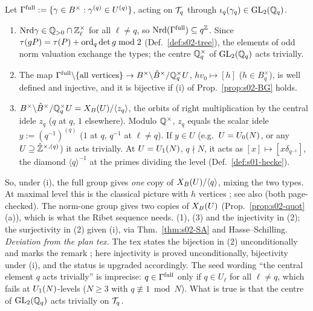 \begin{remark}\label{rem:s02-normone}
Let $\Gamma^{\rm full}:=\{\gamma\in B^\times:\gamma^{(q)}\in U^{(q)}\}$, acting on $\mathcal{T}_q$ through $\iota_q(\gamma_q)\in\mathrm{GL}_2(\mathbb{Q}_q)$.
\begin{enumerate}[label=(\arabic*)]
\item $\mathrm{Nrd}\gamma\in\mathbb{Q}_{>0}\cap\mathbb{Z}_\ell^\times$ for all $\ell\ne q$, so $\mathrm{Nrd}(\Gamma^{\rm full})\subseteq q^{\mathbb{Z}}$. Since
  $\tau(gP)=\tau(P)+\mathrm{ord}_q\det g\bmod2$ (Def.~\ref{def:s02-tree}), the elements of odd norm valuation exchange the types; the centre
  $\mathbb{Q}_q^\times$ of $\mathrm{GL}_2(\mathbb{Q}_q)$ acts trivially.
\item The map $\Gamma^{\rm full}\backslash\{\text{all vertices}\}\to B^\times\backslash\hat{B}^\times/\mathbb{Q}_q^\times U$, $hv_0\mapsto[h]$
  ($h\in B_q^\times$), is well defined and injective, and it is bijective if (i) of Prop.~\ref{prop:s02-BG} holds.
\item $B^\times\backslash\hat{B}^\times/\mathbb{Q}_q^\times U=X_B(U)/\langle z_q\rangle$, the orbits of right multiplication by the central idele $z_q$
  ($q$ at $q$, $1$ elsewhere). Modulo $\mathbb{Q}^\times$, $z_q$ equals the scalar idele $y:=(q^{-1})^{(q)}$ ($1$ at $q$, $q^{-1}$ at $\ell\ne q$).
  If $y\in U$ (e.g.\ $U=U_0(N)$, or any $U\supseteq\hat{\mathbb{Z}}^{\times,(q)}$) it acts trivially. At $U=U_1(N)$, $q\nmid N$, it acts as
  $[x]\mapsto[x\delta_{q^{-1}}]$, the diamond $\langle q\rangle^{-1}$ at the primes dividing the level (Def.~\ref{def:s01-hecke}).
\end{enumerate}
So, under (i), the full group gives \emph{one} copy of $X_B(U)/\langle q\rangle$, mixing the two types. At maximal level this is the classical picture
with $h$ vertices ; see also  (both page-checked). The norm-one group gives two copies of $X_B(U)$ (Prop.~\ref{prop:s02-quot}(a)), which is what the Ribet
sequence needs.
\stproved{} (1), (3) and the injectivity in (2); the surjectivity in (2) \stproved{} given (i), \stpmc{} via
Thm.~\ref{thm:s02-SA} and Hasse--Schilling.
\emph{Deviation from the plan tex.} The tex states the bijection in (2) unconditionally and marks the remark \stsketch; here
injectivity is proved unconditionally, bijectivity under (i), and the status is upgraded accordingly.
The seed wording ``the central element $q$ acts trivially'' is imprecise: $q\in\Gamma^{\rm full}$ only if $q\in U_\ell$ for all $\ell\ne q$,
which fails at $U_1(N)$-levels ($N\ge3$ with $q\not\equiv1\bmod N$). What is true is that the centre of $\mathrm{GL}_2(\mathbb{Q}_q)$ acts trivially
on $\mathcal{T}_q$.
\end{remark}

